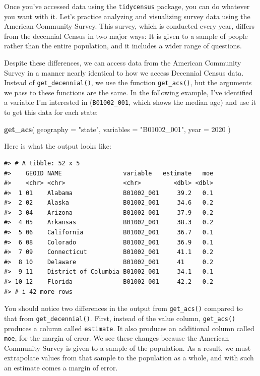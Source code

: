 \documentclass[
]{book}
\newenvironment{Shaded}{\begin{snugshade}}{\end{snugshade}}
\newcommand{\AttributeTok}[1]{\textcolor[rgb]{0.13,0.29,0.53}{#1}}
\newcommand{\DecValTok}[1]{\textcolor[rgb]{0.00,0.00,0.81}{#1}}
\newcommand{\FunctionTok}[1]{\textcolor[rgb]{0.13,0.29,0.53}{\textbf{#1}}}
\newcommand{\NormalTok}[1]{#1}
\newcommand{\StringTok}[1]{\textcolor[rgb]{0.31,0.60,0.02}{#1}}
\begin{document}
Once you've accessed data using the \texttt{tidycensus} package, you can do whatever you want with it. Let's practice analyzing and visualizing survey data using the American Community Survey. This survey, which is conducted every year, differs from the decennial Census in two major ways: It is given to a sample of people rather than the entire population, and it includes a wider range of questions.

Despite these differences, we can access data from the American Community Survey in a manner nearly identical to how we access Decennial Census data. Instead of \texttt{get\_decennial()}, we use the function \texttt{get\_acs()}, but the arguments we pass to these functions are the same. In the following example, I've identified a variable I'm interested in (\texttt{B01002\_001}, which shows the median age) and use it to get this data for each state:

\begin{Shaded}
\begin{Highlighting}[]
\FunctionTok{get\_acs}\NormalTok{(}
  \AttributeTok{geography =} \StringTok{"state"}\NormalTok{,}
  \AttributeTok{variables =} \StringTok{"B01002\_001"}\NormalTok{,}
  \AttributeTok{year =} \DecValTok{2020}
\NormalTok{)}
\end{Highlighting}
\end{Shaded}

Here is what the output looks like:

\begin{verbatim}
#> # A tibble: 52 x 5
#>    GEOID NAME                 variable   estimate   moe
#>    <chr> <chr>                <chr>         <dbl> <dbl>
#>  1 01    Alabama              B01002_001     39.2   0.1
#>  2 02    Alaska               B01002_001     34.6   0.2
#>  3 04    Arizona              B01002_001     37.9   0.2
#>  4 05    Arkansas             B01002_001     38.3   0.2
#>  5 06    California           B01002_001     36.7   0.1
#>  6 08    Colorado             B01002_001     36.9   0.1
#>  7 09    Connecticut          B01002_001     41.1   0.2
#>  8 10    Delaware             B01002_001     41     0.2
#>  9 11    District of Columbia B01002_001     34.1   0.1
#> 10 12    Florida              B01002_001     42.2   0.2
#> # i 42 more rows
\end{verbatim}

You should notice two differences in the output from \texttt{get\_acs()} compared to that from \texttt{get\_decennial()}. First, instead of the value column, \texttt{get\_acs()} produces a column called \texttt{estimate}. It also produces an additional column called \texttt{moe}, for the margin of error. We see these changes because the American Community Survey is given to a sample of the population. As a result, we must extrapolate values from that sample to the population as a whole, and with such an estimate comes a margin of error.
\end{document}

